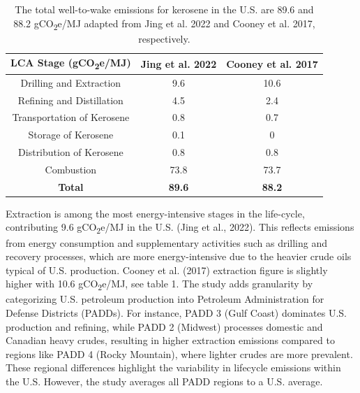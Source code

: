 \documentclass[12pt]{article}
\begin{document}
\begin{table}[h!]
\centering
\label{tab:lca_emissions_comparison}
\begin{tabular}{|c|c|c|}
\hline
\textbf{LCA Stage (gCO\textsubscript{2}e/MJ)} & \textbf{Jing et al. 2022} & \textbf{Cooney et al. 2017 } \\
\hline
Drilling and Extraction & 9.6 & 10.6 \\
Refining and Distillation & 4.5 & 2.4 \\
Transportation of Kerosene & 0.8 & 0.7 \\
Storage of Kerosene & 0.1 & 0 \\
Distribution of Kerosene & 0.8 & 0.8 \\
Combustion & 73.8 & 73.7 \\
\hline
\textbf{Total} & \textbf{89.6} & \textbf{88.2} \\
\hline
\end{tabular}
\caption{The total well-to-wake emissions for kerosene in the U.S. are 89.6 and 88.2  gCO\textsubscript{2}e/MJ adapted from Jing et al. 2022 and Cooney et al. 2017, respectively.}
\label{tab:kerosene_emissions}
\end{table}


Extraction is among the most energy-intensive stages in the life-cycle, contributing 9.6 gCO\textsubscript{2}e/MJ in the U.S. (Jing et al., 2022). This reflects emissions from energy consumption and supplementary activities such as drilling and recovery processes, which are more energy-intensive due to the heavier crude oils typical of U.S. production. Cooney et al. (2017) extraction figure is slightly higher with 10.6 gCO\textsubscript{2}e/MJ, see table 1. The study adds granularity by categorizing U.S. petroleum production into Petroleum Administration for Defense Districts (PADDs). For instance, PADD 3 (Gulf Coast) dominates U.S. production and refining, while PADD 2 (Midwest) processes domestic and Canadian heavy crudes, resulting in higher extraction emissions compared to regions like PADD 4 (Rocky Mountain), where lighter crudes are more prevalent. These regional differences highlight the variability in lifecycle emissions within the U.S. However, the study averages all PADD regions to a U.S. average.
\end{document}
